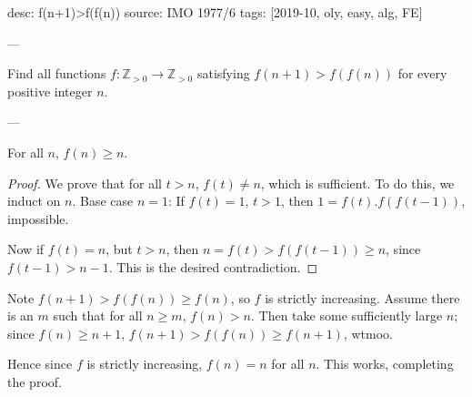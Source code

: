 desc: f(n+1)>f(f(n))
source: IMO 1977/6
tags: [2019-10, oly, easy, alg, FE]

---

Find all functions $f:\mathbb Z_{>0}\to\mathbb Z_{>0}$ satisfying $f(n+1)>f(f(n))$ for every positive integer $n$.

---

\begin{iclaim*}
    For all $n$, $f(n)\ge n$.
\end{iclaim*}
\begin{proof}
    We prove that for all $t>n$, $f(t)\ne n$, which is sufficient. To do this, we induct on $n$. Base case $n=1$: If $f(t)=1$, $t>1$, then $1=f(t).f(f(t-1))$, impossible.

    Now if $f(t)=n$, but $t>n$, then $n=f(t)>f(f(t-1))\ge n$, since $f(t-1)>n-1$. This is the desired contradiction.
\end{proof}

Note $f(n+1)>f(f(n))\ge f(n)$, so $f$ is strictly increasing. Assume there is an $m$ such that for all $n\ge m$, $f(n)>n$. Then take some sufficiently large $n$; since $f(n)\ge n+1$, $f(n+1)>f(f(n))\ge f(n+1)$, wtmoo.

Hence since $f$ is strictly increasing, $f(n)=n$ for all $n$. This works, completing the proof.
